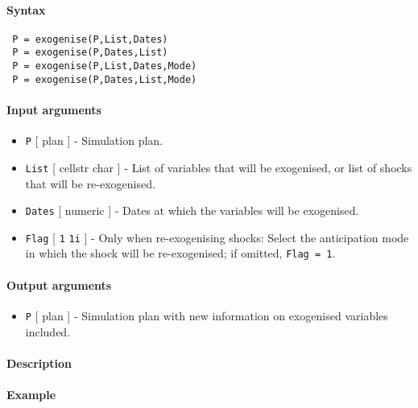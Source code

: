 


	\paragraph{Syntax}
 
 \begin{verbatim}
 P = exogenise(P,List,Dates)
 P = exogenise(P,Dates,List)
 P = exogenise(P,List,Dates,Mode)
 P = exogenise(P,Dates,List,Mode)
 \end{verbatim}
 
 \paragraph{Input arguments}
 
 \begin{itemize}
 \item
   \texttt{P} {[} plan {]} - Simulation plan.
 \item
   \texttt{List} {[} cellstr \textbar{} char {]} - List of variables that
   will be exogenised, or list of shocks that will be re-exogenised.
 \item
   \texttt{Dates} {[} numeric {]} - Dates at which the variables will be
   exogenised.
 \item
   \texttt{Flag} {[} \texttt{1} \textbar{} \texttt{1i} {]} - Only when
   re-exogenising shocks: Select the anticipation mode in which the shock
   will be re-exogenised; if omitted, \texttt{Flag = 1}.
 \end{itemize}
 
 \paragraph{Output arguments}
 
 \begin{itemize}
 \item
   \texttt{P} {[} plan {]} - Simulation plan with new information on
   exogenised variables included.
 \end{itemize}
 
 \paragraph{Description}
 
 \paragraph{Example}


